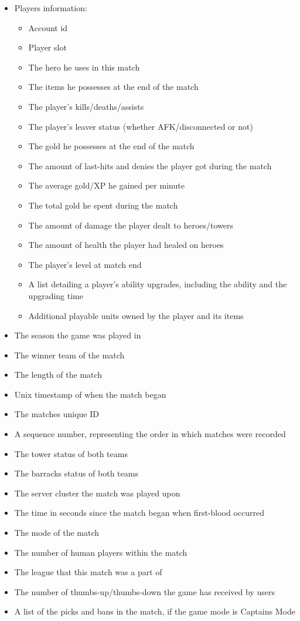 \documentclass{article}
\begin{document}
\begin{itemize}
	\item Players information:
	\begin{itemize}
		\item Account id
		\item Player slot
		\item The hero he uses in this match
		\item The items he possesses at the end of the match
		\item The player's kills/deaths/assists
		\item The player's leaver status (whether AFK/disconnected or not)
		\item The gold he possesses at the end of the match
		\item The amount of last-hits and denies the player got during the match
		\item The average gold/XP he gained per minute
		\item The total gold he spent during the match
		\item The amount of damage the player dealt to heroes/towers
		\item The amount of health the player had healed on heroes
		\item The player's level at match end
		\item A list detailing a player's ability upgrades, including the ability and the upgrading time
		\item Additional playable units owned by the player and its items
	\end{itemize}
	\item The season the game was played in
	\item The winner team of the match
	\item The length of the match
	\item Unix timestamp of when the match began
	\item The matches unique ID
	\item A sequence number, representing the order in which matches were recorded
	\item The tower status of both teams
	\item The barracks status of both teams
	\item The server cluster the match was played upon
	\item The time in seconds since the match began when first-blood occurred
	\item The mode of the match
	\item The number of human players within the match
	\item The league that this match was a part of
	\item The number of thumbs-up/thumbs-down the game has received by users
	\item A list of the picks and bans in the match, if the game mode is Captains Mode
\end{itemize}
\end{document}
